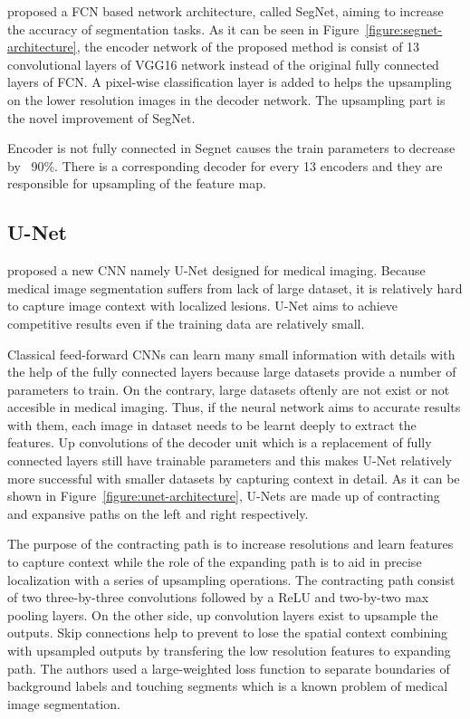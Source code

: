         \citet{badrinarayanan2017segnet} proposed a FCN based network architecture, called SegNet, aiming to increase the accuracy of segmentation tasks.
        As it can be seen in Figure~\ref{figure:segnet-architecture}, the encoder network of the proposed method is consist of 13 convolutional layers of VGG16 network instead of the original fully connected layers of FCN.
        A pixel-wise classification layer is added to helps the upsampling on the lower resolution images in the decoder network.
        The upsampling part is the novel improvement of SegNet.

        

        Encoder is not fully connected in Segnet causes the train parameters to decrease by ~90\%.
        There is a corresponding decoder for every 13 encoders and they are responsible for upsampling of the feature map.

    \subsection{U-Net}\label{section:unet}

        \citet{ronneberger2015u} proposed a new CNN namely U-Net designed for medical imaging.
        Because medical image segmentation suffers from lack of large dataset, it is relatively hard to capture image context with localized lesions.
        U-Net aims to achieve competitive results even if the training data are relatively small.

        

        Classical feed-forward CNNs can learn many small information with details with the help of the fully connected layers because large datasets provide a number of parameters to train.
        On the contrary, large datasets oftenly are not exist or not accesible in medical imaging.
        Thus, if the neural network aims to accurate results with them, each image in dataset needs to be learnt deeply to extract the features.
        Up convolutions of the decoder unit which is a replacement of fully connected layers still have trainable parameters and this makes U-Net relatively more successful with smaller datasets by capturing context in detail.
        As it can be shown in Figure~\ref{figure:unet-architecture}, U-Nets are made up of contracting and expansive paths on the left and right respectively.

        The purpose of the contracting path is to increase resolutions and learn features  to capture context while the role of the expanding path is to aid in precise localization with a series of upsampling operations.
        The contracting path consist of two three-by-three convolutions followed by a ReLU and two-by-two max pooling layers.
        On the other side, up convolution layers exist to upsample the outputs.
        Skip connections help to prevent to lose the spatial context combining with upsampled outputs by transfering the low resolution features to expanding path.
        The authors used a large-weighted loss function to separate boundaries of background labels and touching segments which is a known problem of medical image segmentation.

